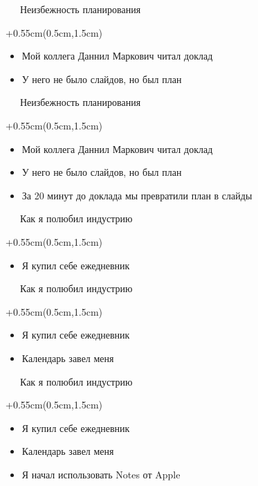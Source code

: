 \documentclass[xetex,18pt,aspectratio=169]{beamer}
\begin{document}
\begin{Large}
\begin{frame}{\ \ \ Неизбежность планирования}
\begin{textblock*}{\framewidth+0.55cm}(0.5cm,1.5cm)
\begin{itemize}
  \item Мой коллега Даннил Маркович читал доклад
  \item У него не было слайдов, но был план
\end{itemize}
\end{textblock*}
\end{frame}

\begin{frame}{\ \ \ Неизбежность планирования}
\begin{textblock*}{\framewidth+0.55cm}(0.5cm,1.5cm)
\begin{itemize}
  \item Мой коллега Даннил Маркович читал доклад
  \item У него не было слайдов, но был план
  \item За 20 минут до доклада мы превратили план в слайды
\end{itemize}
\end{textblock*}
\end{frame}

\begin{frame}{\ \ \ Как я полюбил индустрию}
\begin{textblock*}{\framewidth+0.55cm}(0.5cm,1.5cm)
\begin{itemize}
  \item Я купил себе ежедневник
\end{itemize}
\end{textblock*}
\end{frame}

\begin{frame}{\ \ \ Как я полюбил индустрию}
\begin{textblock*}{\framewidth+0.55cm}(0.5cm,1.5cm)
\begin{itemize}
  \item Я купил себе ежедневник
  \item Календарь завел меня
\end{itemize}
\end{textblock*}
\end{frame}

\begin{frame}{\ \ \ Как я полюбил индустрию}
\begin{textblock*}{\framewidth+0.55cm}(0.5cm,1.5cm)
\begin{itemize}
  \item Я купил себе ежедневник
  \item Календарь завел меня
  \item Я начал использовать Notes от Apple
\end{itemize}
\end{textblock*}
\end{frame}


\end{Large}
\end{document}
